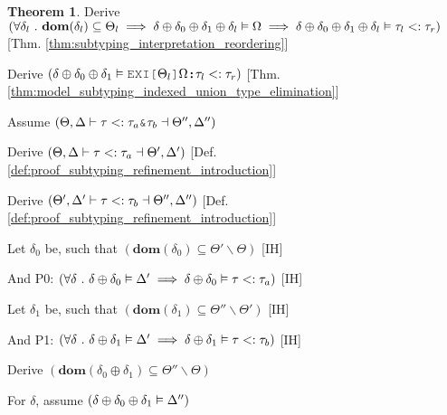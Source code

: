 \documentclass[acmsmall]{acmart}
\theoremstyle{definition}
\newtheorem{theorem}{Theorem}[section]
\begin{document}
\begin{theorem}
  \item \I\I \N Derive $(
    \forall \delta_l \ .\ 
    \textbf{dom}(\delta_l) \subseteq \Theta_l
    \implies
    \delta \oplus \delta_0 \oplus \delta_1 \oplus \delta_l \vDash \Omega
    \implies
    \delta \oplus \delta_0 \oplus \delta_1 \oplus \delta_l \vDash \tau_l <: \tau_r
  )$ [Thm. \ref{thm:subtyping_interpretation_reordering}]

  \item \I\I \N Derive $(
    \delta \oplus \delta_0 \oplus \delta_1 \satisfies \J{EXI[} \Theta_l \J{]} \Omega \J{:} \tau_l \subtypes \tau_r
  )$ [Thm. \ref{thm:model_subtyping_indexed_union_type_elimination}]



  \item \N Assume $(
    \Theta, \Delta \entails
    \tau \subtypes \tau_{a}\J{\&}\tau_{b} \given \Theta'', \Delta''
  )$

  \item \I \N Derive $(
    \Theta, \Delta \vdash
    \tau <: \tau_{a} \dashv \Theta', \Delta' 
  )$ [Def. \ref{def:proof_subtyping_refinement_introduction}]

  \item \I \N Derive $(
    \Theta', \Delta' \vdash
    \tau <: \tau_{b} \dashv \Theta'', \Delta''
  )$ [Def. \ref{def:proof_subtyping_refinement_introduction}]

  \item \I \N Let $\delta_0$ be, such that $(
    \textbf{dom}(\delta_0) \subseteq \Theta' \backslash \Theta
  )$ [IH]
  \item \I \N And P0: $(
    \forall \delta \ .\  
    \delta \oplus \delta_0 \vDash \Delta' 
    \implies 
    \delta \oplus \delta_0 \vDash \tau <: \tau_a
  )$ [IH]

  \item \I \N Let $\delta_1$ be, such that $(
    \textbf{dom}(\delta_1) \subseteq \Theta'' \backslash \Theta'
  )$ [IH]
  \item \I \N And P1: $(
    \forall \delta \ .\  
    \delta \oplus \delta_1 \vDash \Delta' 
    \implies 
    \delta \oplus \delta_1 \vDash \tau <: \tau_b
  )$ [IH]

  \item \I \N Derive $(
    \textbf{dom}(\delta_0 \oplus \delta_1) \subseteq \Theta'' \backslash \Theta
  )$
  \item \I \N For $\delta$, 
    assume $(\delta \oplus \delta_0 \oplus \delta_1 \vDash \Delta'')$


\end{theorem}
\end{document}
